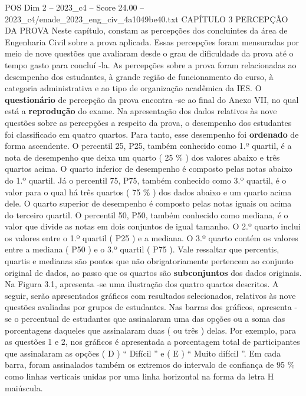 \begin{textsample}{POS Dim 2 – 2023\_c4 – Score 24.00 – 2023\_c4/enade\_2023\_eng\_civ\_4a1049be40.txt}  \label{ex:f2_pos_011}
CAPÍTULO 3 PERCEPÇÃO DA PROVA Neste capítulo, constam as percepções dos concluintes da área de Engenharia Civil sobre a prova aplicada.
Essas percepções foram mensuradas por meio de nove questões que avaliaram desde o grau de dificuldade da prova até o tempo gasto para concluí -la.
As percepções sobre a prova foram relacionadas ao desempenho dos estudantes, à grande região de funcionamento do curso, à categoria administrativa e ao tipo de organização acadêmica da IES.
O \textbf{questionário} de percepção da prova encontra -se ao final do Anexo VII, no qual está a \textbf{reprodução} do exame.
Na apresentação dos dados relativos às nove questões sobre as percepções a respeito da prova, o desempenho dos estudantes foi classificado em quatro quartos.
Para tanto, esse desempenho foi \textbf{ordenado} de forma ascendente.
O percentil 25, P25, também conhecido como 1.º quartil, é a nota de desempenho que deixa um quarto ( 25 \% ) dos valores abaixo e três quartos acima.
O quarto inferior de desempenho é composto pelas notas abaixo do 1.º quartil.
Já o percentil 75, P75, também conhecido como 3.º quartil, é o valor para o qual há três quartos ( 75 \% ) dos dados abaixo e um quarto acima dele.
O quarto superior de desempenho é composto pelas notas iguais ou acima do terceiro quartil.
O percentil 50, P50, também conhecido como mediana, é o valor que divide as notas em dois conjuntos de igual tamanho.
O 2.º quarto inclui os valores entre o 1.º quartil ( P25 ) e a mediana.
O 3.º quarto contém os valores entre a mediana ( P50 ) e o 3.º quartil ( P75 ).
Vale ressaltar que percentis, quartis e medianas são pontos que não obrigatoriamente pertencem ao conjunto original de dados, ao passo que os quartos são \textbf{subconjuntos} dos dados originais.
Na Figura 3.1, apresenta -se uma ilustração dos quatro quartos descritos.
A seguir, serão apresentados gráficos com resultados selecionados, relativos às nove questões avaliadas por grupos de estudantes.
Nas barras dos gráficos, apresenta -se o percentual de estudantes que assinalaram uma das opções ou a soma das porcentagens daqueles que assinalaram duas ( ou três ) delas.
Por exemplo, para as questões 1 e 2, nos gráficos é apresentada a porcentagem total de participantes que assinalaram as opções ( D ) “ Difícil ” e ( E ) “ Muito difícil ”.
Em cada barra, foram assinalados também os extremos do intervalo de confiança de 95 \% como linhas verticais unidas por uma linha horizontal na forma da letra H maiúscula.

\end{textsample}
